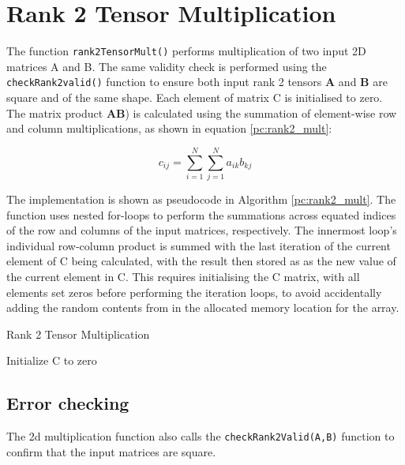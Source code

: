 \documentclass[10 pt, conference]{cssconf}
\begin{document}
\section{Rank 2 Tensor Multiplication}
The function \verb|rank2TensorMult()| performs multiplication of two input 2D matrices A and B. The same validity check is performed using the \verb|checkRank2valid()| function to ensure both input rank 2 tensors $\mathbf{A}$ and $\mathbf{B}$ are square and of the same shape.
Each element of matrix C is initialised to zero. The matrix product $\mathbf{AB}$) is calculated using the summation of element-wise row and column multiplications, as shown in equation \ref{pc:rank2_mult}:

\begin{equation}\label{eq:product_2d}
    c_{ij} \mathrel{{=}}
     \sum_{i=1}^{N}\sum_{j=1}^{N} a_{ik}b_{kj}
\end{equation}

The implementation is shown as pseudocode in Algorithm \ref{pc:rank2_mult}. The function uses nested for-loops to perform the summations across equated indices of the row and columns of the input matrices, respectively. The innermost loop's individual row-column product is summed with the last iteration of the current element of C being calculated, with the result then stored as as the new value of the current element in C. This requires initialising the C matrix, with all elements set zeros before performing the iteration loops, to avoid accidentally adding the random contents from in the allocated memory location for the array.

\begin{algorithm}[ht]
\caption{Rank 2 Tensor Multiplication}\label{pc:rank2_mult}
    	 \SetAlgoLined
	Initialize C to zero\;
\end{algorithm}

\subsection{Error checking}
The 2d multiplication function also calls the \verb|checkRank2Valid(A,B)| function to confirm that the input matrices are square.

\end{document}
